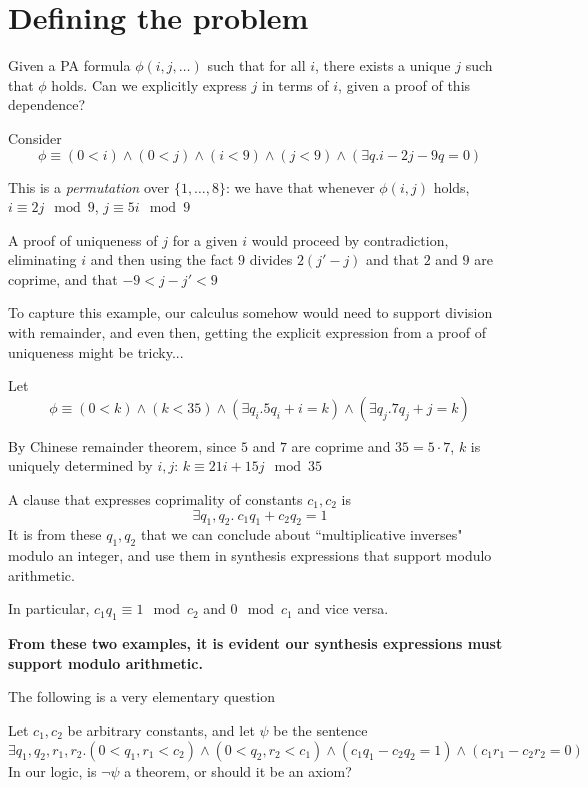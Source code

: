 \documentclass{article}
\begin{document}
\section{Defining the problem}

\begin{question}[Adwait]
Given a PA formula $\phi(i, j, \dots)$ such that for all $i$, there exists a unique $j$ such that $\phi$ holds. Can we explicitly express $j$ in terms of $i$, given a proof of this dependence?
\end{question}

\begin{example}
Consider $$\phi \equiv (0 < i) \land (0 < j) \land (i < 9) \land (j < 9) \land (\exists q. i - 2j -9q = 0)$$
\end{example}
This is a \emph{permutation} over $\{1, \dots, 8\}$: we have that whenever $\phi(i, j)$ holds, $i \equiv 2j \mod 9$, $j \equiv 5i \mod 9$

A proof of uniqueness of $j$ for a given $i$ would proceed by contradiction, eliminating $i$ and then using the fact $9$ divides $2(j' - j)$ and that $2$ and $9$ are coprime, and that $-9 <  j - j' < 9$ 

To capture this example, our calculus somehow would need to support division with remainder, and even then, getting the explicit expression from a proof of uniqueness might be tricky...

\begin{example}
Let
$$
\phi \equiv (0 < k) \land (k < 35) \land (\exists q_i. 5q_i + i = k) \land (\exists q_j . 7q_j + j = k)
$$
\end{example}
By Chinese remainder theorem, since $5$ and $7$ are coprime and $35 = 5 \cdot 7$, $k$ is uniquely determined by $i, j$: $k \equiv 21i + 15j \mod 35$

A clause that expresses coprimality of constants $c_1, c_2$ is 
$$
\exists q_1, q_2 . ~c_1q_1 + c_2 q_2 = 1
$$
It is from these $q_1, q_2$ that we can conclude about ``multiplicative inverses" modulo an integer, and use them in synthesis expressions that support modulo arithmetic.

In particular, $c_1 q_1 \equiv 1 \mod c_2$ and $0 \mod c_1$ and vice versa.

\textbf{From these two examples, it is evident our synthesis expressions must support modulo arithmetic.}

The following is a very elementary question
\begin{question}[Coprimality]
Let $c_1, c_2$ be arbitrary constants, and let $\psi$ be the sentence
$$
\exists q_1, q_2, r_1, r_2 .(0 < q_1, r_1 < c_2) \land (0 < q_2, r_2 < c_1) \land (c_1q_1 - c_2q_2 = 1) \land (c_1r_1 - c_2r_2 = 0)
$$
In our logic, is $\neg \psi$ a theorem, or should it be an axiom?
\end{question}
\end{document}
